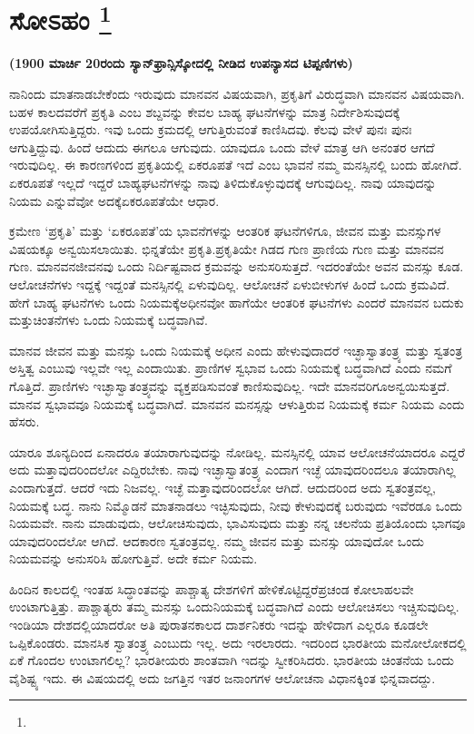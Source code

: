
\chapter[ಸೋಽಹಂ ]{ಸೋಽಹಂ \protect\footnote{}}

\centerline{\textbf{(1900 ಮಾರ್ಚಿ 20ರಂದು ಸ್ಯಾನ್​ಫ್ರಾನ್ಸಿಸ್ಕೋದಲ್ಲಿ ನೀಡಿದ ಉಪನ್ಯಾಸದ ಟಿಪ್ಪಣಿಗಳು)}}

ನಾನಿಂದು ಮಾತನಾಡಬೇಕೆಂದು ಇರುವುದು ಮಾನವನ ವಿಷಯವಾಗಿ, ಪ್ರಕೃತಿಗೆ ವಿರುದ್ಧವಾಗಿ ಮಾನವನ ವಿಷಯವಾಗಿ. ಬಹಳ ಕಾಲದವರೆಗೆ ಪ್ರಕೃತಿ ಎಂಬ ಶಬ್ದವನ್ನು ಕೇವಲ ಬಾಹ್ಯ ಘಟನೆಗಳನ್ನು ಮಾತ್ರ ನಿರ್ದೇಶಿಸುವುದಕ್ಕೆ ಉಪಯೋಗಿಸುತ್ತಿದ್ದರು. ಇವು ಒಂದು ಕ್ರಮದಲ್ಲಿ ಆಗುತ್ತಿರುವಂತೆ ಕಾಣಿಸಿದವು. ಕೆಲವು ವೇಳೆ ಪುನಃ ಪುನಃ ಆಗುತ್ತಿದ್ದುವು. ಹಿಂದೆ ಆದುದು ಈಗಲೂ ಆಗುವುದು. ಯಾವುದೂ ಒಂದು ವೇಳೆ ಮಾತ್ರ ಆಗಿ ಅನಂತರ ಆಗದೆ ಇರುವುದಿಲ್ಲ. ಈ ಕಾರಣಗಳಿಂದ ಪ್ರಕೃತಿಯಲ್ಲಿ ಏಕರೂಪತೆ ಇದೆ ಎಂಬ ಭಾವನೆ ನಮ್ಮ ಮನಸ್ಸಿನಲ್ಲಿ ಬಂದು ಹೋಗಿದೆ. ಏಕರೂಪತೆ ಇಲ್ಲದೆ ಇದ್ದರೆ ಬಾಹ್ಯಘಟನೆಗಳನ್ನು ನಾವು ತಿಳಿದುಕೊಳ್ಳುವುದಕ್ಕೆ ಆಗುವುದಿಲ್ಲ. ನಾವು ಯಾವುದನ್ನು ನಿಯಮ ಎನ್ನುವೆವೋ ಅದಕ್ಕೆ\break ಏಕರೂಪತೆಯೇ ಆಧಾರ.

ಕ್ರಮೇಣ ‘ಪ್ರಕೃತಿ’ ಮತ್ತು ‘ಏಕರೂಪತೆ’ಯ ಭಾವನೆಗಳನ್ನು ಆಂತರಿಕ ಘಟನೆಗಳಿಗೂ, ಜೀವನ ಮತ್ತು ಮನಸ್ಸುಗಳ ವಿಷಯಕ್ಕೂ ಅನ್ವಯಿಸಲಾಯಿತು. ಭಿನ್ನತೆಯೇ ಪ್ರಕೃತಿ.\break ಪ್ರಕೃತಿಯೇ ಗಿಡದ ಗುಣ ಪ್ರಾಣಿಯ ಗುಣ ಮತ್ತು ಮಾನವನ ಗುಣ. ಮಾನವನ\break ಜೀವನವು ಒಂದು ನಿರ್ದಿಷ್ಟವಾದ ಕ್ರಮವನ್ನು ಅನುಸರಿಸುತ್ತದೆ. ಇದರಂತೆಯೇ ಅವನ ಮನಸ್ಸು ಕೂಡ. ಆಲೋಚನೆಗಳು ಇದ್ದಕ್ಕೆ ಇದ್ದಂತೆ ಮನಸ್ಸಿನಲ್ಲಿ ಏಳುವುದಿಲ್ಲ. ಆಲೋಚನೆ ಏಳುಬೀಳುಗಳ ಹಿಂದೆ ಒಂದು ಕ್ರಮವಿದೆ. ಹೇಗೆ ಬಾಹ್ಯ ಘಟನೆಗಳು ಒಂದು ನಿಯಮಕ್ಕೆ\break ಅಧೀನವೋ ಹಾಗೆಯೇ ಆಂತರಿಕ ಘಟನೆಗಳು ಎಂದರೆ ಮಾನವನ ಬದುಕು ಮತ್ತು\break ಚಿಂತನೆಗಳು ಒಂದು ನಿಯಮಕ್ಕೆ ಬದ್ಧವಾಗಿವೆ.

ಮಾನವ ಜೀವನ ಮತ್ತು ಮನಸ್ಸು ಒಂದು ನಿಯಮಕ್ಕೆ ಅಧೀನ ಎಂದು ಹೇಳುವುದಾದರೆ ಇಚ್ಛಾಸ್ವಾತಂತ್ರ್ಯ ಮತ್ತು ಸ್ವತಂತ್ರ ಅಸ್ತಿತ್ವ ಎಂಬುವು ಇಲ್ಲವೇ ಇಲ್ಲ ಎಂದಾಯಿತು. ಪ್ರಾಣಿಗಳ ಸ್ವಭಾವ ಒಂದು ನಿಯಮಕ್ಕೆ ಬದ್ಧವಾಗಿದೆ ಎಂದು ನಮಗೆ ಗೊತ್ತಿದೆ. ಪ್ರಾಣಿಗಳು ಇಚ್ಛಾಸ್ವಾತಂತ್ರ್ಯವನ್ನು ವ್ಯಕ್ತಪಡಿಸುವಂತೆ ಕಾಣಿಸುವುದಿಲ್ಲ. ಇದೇ ಮಾನವರಿಗೂ\break ಅನ್ವಯಿಸುತ್ತದೆ. ಮಾನವ ಸ್ವಭಾವವೂ ನಿಯಮಕ್ಕೆ ಬದ್ಧವಾಗಿದೆ. ಮಾನವನ ಮನಸ್ಸನ್ನು ಆಳುತ್ತಿರುವ ನಿಯಮಕ್ಕೆ ಕರ್ಮ ನಿಯಮ ಎಂದು ಹೆಸರು.

ಯಾರೂ ಶೂನ್ಯದಿಂದ ಏನಾದರೂ ತಯಾರಾಗುವುದನ್ನು ನೋಡಿಲ್ಲ. ಮನಸ್ಸಿನಲ್ಲಿ ಯಾವ ಆಲೋಚನೆಯಾದರೂ ಎದ್ದರೆ ಅದು ಮತ್ತಾವುದರಿಂದಲೋ ಎದ್ದಿರಬೇಕು. ನಾವು ಇಚ್ಛಾಸ್ವಾತಂತ್ರ್ಯ ಎಂದಾಗ ಇಚ್ಛೆ ಯಾವುದರಿಂದಲೂ ತಯಾರಾಗಿಲ್ಲ ಎಂದಾಗುತ್ತದೆ. ಆದರೆ ಇದು ನಿಜವಲ್ಲ. ಇಚ್ಛೆ ಮತ್ತಾವುದರಿಂದಲೋ ಆಗಿದೆ. ಆದುದರಿಂದ ಅದು ಸ್ವತಂತ್ರವಲ್ಲ, ನಿಯಮಕ್ಕೆ ಬದ್ಧ. ನಾನು ನಿಮ್ಮೊಡನೆ ಮಾತನಾಡಲು ಇಚ್ಛಿಸುವುದು, ನೀವು ಕೇಳುವುದಕ್ಕೆ ಬರುವುದು ಇವೆರಡೂ ಒಂದು ನಿಯಮವೇ. ನಾನು ಮಾಡುವುದು, ಆಲೋಚಿಸುವುದು, ಭಾವಿಸುವುದು ಮತ್ತು ನನ್ನ ಚಲನೆಯ ಪ್ರತಿಯೊಂದು ಭಾಗವೂ ಯಾವುದರಿಂದಲೋ ಆಗಿದೆ. ಆದಕಾರಣ ಸ್ವತಂತ್ರವಲ್ಲ. ನಮ್ಮ ಜೀವನ ಮತ್ತು ಮನಸ್ಸು ಯಾವುದೋ ಒಂದು ನಿಯಮವನ್ನು ಅನುಸರಿಸಿ ಹೋಗುತ್ತಿವೆ. ಅದೇ ಕರ್ಮ ನಿಯಮ.

ಹಿಂದಿನ ಕಾಲದಲ್ಲಿ ಇಂತಹ ಸಿದ್ಧಾಂತವನ್ನು ಪಾಶ್ಚಾತ್ಯ ದೇಶಗಳಿಗೆ ಹೇಳಿಕೊಟ್ಟಿದ್ದರೆ\break ಪ್ರಚಂಡ ಕೋಲಾಹಲವೇ ಉಂಟಾಗುತ್ತಿತ್ತು. ಪಾಶ್ಚಾತ್ಯರು ತಮ್ಮ ಮನಸ್ಸು ಒಂದು\break ನಿಯಮಕ್ಕೆ ಬದ್ಧವಾಗಿದೆ ಎಂದು ಆಲೋಚಿಸಲು ಇಚ್ಚಿಸುವುದಿಲ್ಲ. ಇಂಡಿಯಾ ದೇಶದಲ್ಲಿ\-ಯಾದರೋ ಅತಿ ಪುರಾತನಕಾಲದ ದಾರ್ಶನಿಕರು ಇದನ್ನು ಹೇಳಿದಾಗ ಎಲ್ಲರೂ ಕೂಡಲೇ ಒಪ್ಪಿಕೊಂಡರು. ಮಾನಸಿಕ ಸ್ವಾತಂತ್ರ್ಯ ಎಂಬುದು ಇಲ್ಲ. ಅದು ಇರಲಾರದು. ಇದರಿಂದ ಭಾರತೀಯ ಮನೋಲೋಕದಲ್ಲಿ ಏಕೆ ಗೊಂದಲ ಉಂಟಾಗಲಿಲ್ಲ? ಭಾರತೀಯರು ಶಾಂತವಾಗಿ ಇದನ್ನು ಸ್ವೀಕರಿಸಿದರು. ಭಾರತೀಯ ಚಿಂತನೆಯ ಒಂದು ವೈಶಿಷ್ಟ್ಯ ಇದು. ಈ ವಿಷಯದಲ್ಲಿ ಅದು ಜಗತ್ತಿನ ಇತರ ಜನಾಂಗಗಳ ಆಲೋಚನಾ ವಿಧಾನಕ್ಕಿಂತ ಭಿನ್ನವಾದದ್ದು.

